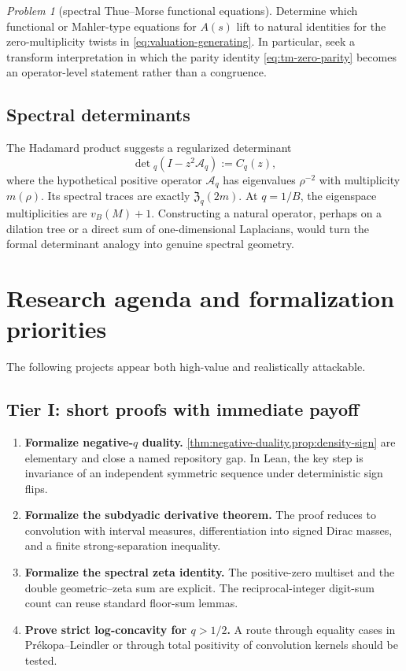 \documentclass[11pt,oneside]{article}
\theoremstyle{definition}
\theoremstyle{remark}
\newtheorem{problem}[theorem]{Problem}
\begin{document}
\begin{problem}[spectral Thue--Morse functional equations]\label{prob:spectral-TM}
Determine which functional or Mahler-type equations for $A(s)$ lift to natural identities for the zero-multiplicity twists in \cref{eq:valuation-generating}.  In particular, seek a transform interpretation in which the parity identity \cref{eq:tm-zero-parity} becomes an operator-level statement rather than a congruence.
\end{problem}

\subsection{Spectral determinants}

The Hadamard product suggests a regularized determinant
\[
 \det{}_q(I-z^2\mathcal A_q)
 :=C_q(z),
\]
where the hypothetical positive operator $\mathcal A_q$ has eigenvalues $\rho^{-2}$ with multiplicity $m(\rho)$.  Its spectral traces are exactly $\mathfrak Z_q(2m)$.  At $q=1/B$, the eigenspace multiplicities are $v_B(M)+1$.  Constructing a natural operator, perhaps on a dilation tree or a direct sum of one-dimensional Laplacians, would turn the formal determinant analogy into genuine spectral geometry.

\section{Research agenda and formalization priorities}

The following projects appear both high-value and realistically attackable.

\subsection{Tier I: short proofs with immediate payoff}

\begin{enumerate}
  \item \textbf{Formalize negative-$q$ duality.}  \cref{thm:negative-duality,prop:density-sign} are elementary and close a named repository gap.  In Lean, the key step is invariance of an independent symmetric sequence under deterministic sign flips.
  \item \textbf{Formalize the subdyadic derivative theorem.}  The proof reduces to convolution with interval measures, differentiation into signed Dirac masses, and a finite strong-separation inequality.
  \item \textbf{Formalize the spectral zeta identity.}  The positive-zero multiset and the double geometric--zeta sum are explicit.  The reciprocal-integer digit-sum count can reuse standard floor-sum lemmas.
  \item \textbf{Prove strict log-concavity for $q>1/2$.}  A route through equality cases in Pr\'ekopa--Leindler or through total positivity of convolution kernels should be tested.
\end{enumerate}
\end{document}
